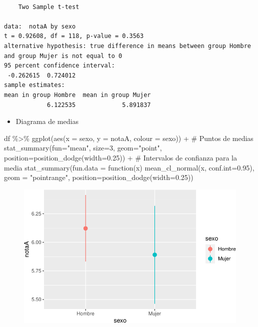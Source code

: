 \documentclass[
  a4paper,
]{scrreport}
\newenvironment{Shaded}{\begin{snugshade}}{\end{snugshade}}
\newcommand{\AttributeTok}[1]{\textcolor[rgb]{0.40,0.45,0.13}{#1}}
\newcommand{\CommentTok}[1]{\textcolor[rgb]{0.37,0.37,0.37}{#1}}
\newcommand{\ControlFlowTok}[1]{\textcolor[rgb]{0.00,0.23,0.31}{#1}}
\newcommand{\DecValTok}[1]{\textcolor[rgb]{0.68,0.00,0.00}{#1}}
\newcommand{\FloatTok}[1]{\textcolor[rgb]{0.68,0.00,0.00}{#1}}
\newcommand{\FunctionTok}[1]{\textcolor[rgb]{0.28,0.35,0.67}{#1}}
\newcommand{\NormalTok}[1]{\textcolor[rgb]{0.00,0.23,0.31}{#1}}
\newcommand{\SpecialCharTok}[1]{\textcolor[rgb]{0.37,0.37,0.37}{#1}}
\newcommand{\StringTok}[1]{\textcolor[rgb]{0.13,0.47,0.30}{#1}}
\providecommand{\tightlist}{%
  \setlength{\itemsep}{0pt}\setlength{\parskip}{0pt}}\usepackage{longtable,booktabs,array}
\theoremstyle{definition}
\theoremstyle{definition}
\theoremstyle{remark}
\begin{document}
\begin{verbatim}

    Two Sample t-test

data:  notaA by sexo
t = 0.92608, df = 118, p-value = 0.3563
alternative hypothesis: true difference in means between group Hombre and group Mujer is not equal to 0
95 percent confidence interval:
 -0.262615  0.724012
sample estimates:
mean in group Hombre  mean in group Mujer 
            6.122535             5.891837 
\end{verbatim}

\begin{itemize}
\tightlist
\item
  Diagrama de medias
\end{itemize}

\begin{Shaded}
\begin{Highlighting}[]
\NormalTok{df }\SpecialCharTok{\%\textgreater{}\%} \FunctionTok{ggplot}\NormalTok{(}\FunctionTok{aes}\NormalTok{(}\AttributeTok{x =}\NormalTok{ sexo, }\AttributeTok{y =}\NormalTok{ notaA, }\AttributeTok{colour =}\NormalTok{ sexo)) }\SpecialCharTok{+} 
  \CommentTok{\# Puntos de medias}
  \FunctionTok{stat\_summary}\NormalTok{(}\AttributeTok{fun=}\StringTok{"mean"}\NormalTok{, }\AttributeTok{size=}\DecValTok{3}\NormalTok{,  }\AttributeTok{geom=}\StringTok{"point"}\NormalTok{, }\AttributeTok{position=}\FunctionTok{position\_dodge}\NormalTok{(}\AttributeTok{width=}\FloatTok{0.25}\NormalTok{)) }\SpecialCharTok{+} 
  \CommentTok{\# Intervalos de confianza para la media}
  \FunctionTok{stat\_summary}\NormalTok{(}\AttributeTok{fun.data =} \ControlFlowTok{function}\NormalTok{(x) }\FunctionTok{mean\_cl\_normal}\NormalTok{(x, }\AttributeTok{conf.int=}\FloatTok{0.95}\NormalTok{), }\AttributeTok{geom =} \StringTok{"pointrange"}\NormalTok{, }\AttributeTok{position=}\FunctionTok{position\_dodge}\NormalTok{(}\AttributeTok{width=}\FloatTok{0.25}\NormalTok{)) }
\end{Highlighting}
\end{Shaded}

\begin{figure}[H]

{\centering \includegraphics{./08-analisis-estadisticos_files/figure-pdf/unnamed-chunk-35-1.pdf}

}

\end{figure}
\end{document}

